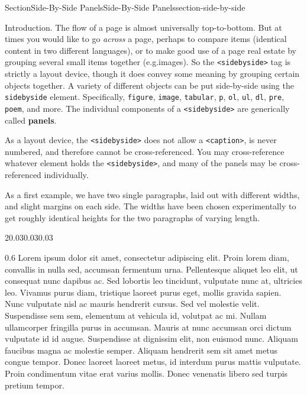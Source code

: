 \documentclass[twoside,10pt,]{article}
\newcommand{\mono}[1]{\texttt{#1}}
\newcommand{\terminology}[1]{\textbf{#1}}
\numberwithin{equation}{section}
\begin{document}
\begin{sectionptx}{Section}{Side-By-Side Panels}{}{Side-By-Side Panels}{}{}{section-side-by-side}
\begin{introduction}{Introduction.}%
The flow of a page is almost universally top-to-bottom.  But at times you would like to go \emph{across} a page, perhaps to compare items (identical content in two different languages), or to make good use of a page real estate by grouping several small items together (e.g.\@ images).  So the \mono{<sidebyside>} tag is strictly a layout device, though it does convey some meaning by grouping certain objects together. A variety of different objects can be put side-by-side using the \mono{sidebyside} element.  Specifically, \mono{figure}, \mono{image}, \mono{tabular}, \mono{p}, \mono{ol}, \mono{ul}, \mono{dl}, \mono{pre}, \mono{poem}, and more.  The individual components of a \mono{<sidebyside>} are generically called \terminology{panels}.%
\par
As a layout device, the \mono{<sidebyside>} does not allow a \mono{<caption>}, is never numbered, and therefore cannot be cross-referenced.  You may cross-reference whatever element holds the \mono{<sidebyside>}, and many of the panels may be cross-referenced individually.%
\par
As a first example, we have two single paragraphs, laid out with different widths, and slight margins on each side.  The widths have been chosen experimentally to get roughly identical heights for the two paragraphs of varying length.%
\begin{sidebyside}{2}{0.03}{0.03}{0.03}%
\begin{sbspanel}{0.6}%
Lorem ipsum dolor sit amet, consectetur adipiscing elit. Proin lorem diam, convallis in nulla sed, accumsan fermentum urna. Pellentesque aliquet leo elit, ut consequat nunc dapibus ac. Sed lobortis leo tincidunt, vulputate nunc at, ultricies leo. Vivamus purus diam, tristique laoreet purus eget, mollis gravida sapien. Nunc vulputate nisl ac mauris hendrerit cursus. Sed vel molestie velit. Suspendisse sem sem, elementum at vehicula id, volutpat ac mi. Nullam ullamcorper fringilla purus in accumsan. Mauris at nunc accumsan orci dictum vulputate id id augue. Suspendisse at dignissim elit, non euismod nunc. Aliquam faucibus magna ac molestie semper. Aliquam hendrerit sem sit amet metus congue tempor. Donec laoreet laoreet metus, id interdum purus mattis vulputate. Proin condimentum vitae erat varius mollis. Donec venenatis libero sed turpis pretium tempor.%
\end{sbspanel}%

\end{sidebyside}
\end{introduction}
\end{sectionptx}
\end{document}

